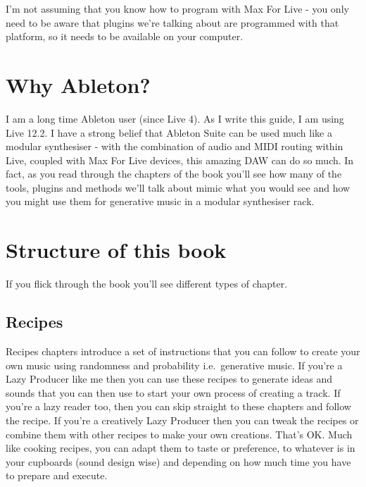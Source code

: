 \documentclass[
  12pt,
  letterpaper,
  oneside,
  open=any]{scrbook}
\begin{document}
I'm not assuming that you know how to program with Max For Live - you
only need to be aware that plugins we're talking about are programmed
with that platform, so it needs to be available on your computer.

\section*{Why Ableton?}\label{why-ableton}


I am a long time Ableton user (since Live 4). As I write this guide, I
am using Live 12.2. I have a strong belief that Ableton Suite can be
used much like a modular synthesiser - with the combination of audio and
MIDI routing within Live, coupled with Max For Live devices, this
amazing DAW can do so much. In fact, as you read through the chapters of
the book you'll see how many of the tools, plugins and methods we'll
talk about mimic what you would see and how you might use them for
generative music in a modular synthesiser rack.

\section*{Structure of this book}\label{structure-of-this-book}


If you flick through the book you'll see different types of chapter.

\subsection*{Recipes}\label{recipes}

Recipes chapters introduce a set of instructions that you can follow to
create your own music using randomness and probability i.e.~generative
music. If you're a Lazy Producer like me then you can use these recipes
to generate ideas and sounds that you can then use to start your own
process of creating a track. If you're a lazy reader too, then you can
skip straight to these chapters and follow the recipe. If you're a
creatively Lazy Producer then you can tweak the recipes or combine them
with other recipes to make your own creations. That's OK. Much like
cooking recipes, you can adapt them to taste or preference, to whatever
is in your cupboards (sound design wise) and depending on how much time
you have to prepare and execute.
\end{document}
